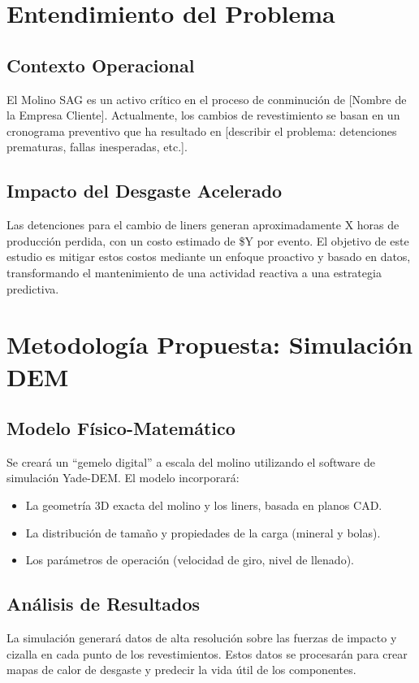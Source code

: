 \documentclass[11pt, a4paper]{article}
\begin{document}
\section{Entendimiento del Problema}
\subsection{Contexto Operacional}
El Molino SAG es un activo crítico en el proceso de conminución de [Nombre de la Empresa Cliente]. Actualmente, los cambios de revestimiento se basan en un cronograma preventivo que ha resultado en [describir el problema: detenciones prematuras, fallas inesperadas, etc.].

\subsection{Impacto del Desgaste Acelerado}
Las detenciones para el cambio de liners generan aproximadamente X horas de producción perdida, con un costo estimado de \$Y por evento. El objetivo de este estudio es mitigar estos costos mediante un enfoque proactivo y basado en datos, transformando el mantenimiento de una actividad reactiva a una estrategia predictiva.

\section{Metodología Propuesta: Simulación DEM}
\subsection{Modelo Físico-Matemático}
Se creará un ``gemelo digital'' a escala del molino utilizando el software de simulación Yade-DEM. El modelo incorporará:
\begin{itemize}
    \item La geometría 3D exacta del molino y los liners, basada en planos CAD.
    \item La distribución de tamaño y propiedades de la carga (mineral y bolas).
    \item Los parámetros de operación (velocidad de giro, nivel de llenado).
\end{itemize}

\subsection{Análisis de Resultados}
La simulación generará datos de alta resolución sobre las fuerzas de impacto y cizalla en cada punto de los revestimientos. Estos datos se procesarán para crear mapas de calor de desgaste y predecir la vida útil de los componentes.
\end{document}
